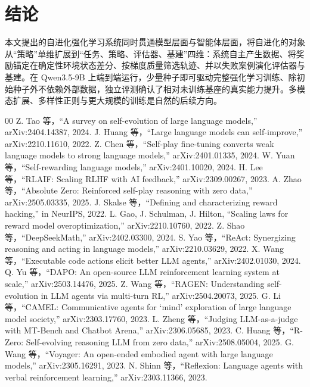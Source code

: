 \documentclass[twocolumn,a4paper]{ctexart}
\begin{document}
\section{结论}

本文提出的自进化强化学习系统同时贯通模型层面与智能体层面，将自进化的对象从“策略”单维扩展到“任务、策略、评估器、基建”四维：系统自主产生数据、将奖励锚定在确定性环境状态差分、按梯度质量筛选轨迹、并以失败案例演化评估器与基建。在 Qwen3.5-9B 上端到端运行，少量种子即可驱动完整强化学习训练、除初始种子外不依赖外部数据，独立评测确认了相对未训练基座的真实能力提升。多模态扩展、多样性正则与更大规模的训练是自然的后续方向。

\begin{thebibliography}{00}
 Z. Tao 等，“A survey on self-evolution of large language models,” arXiv:2404.14387, 2024.
 J. Huang 等，“Large language models can self-improve,” arXiv:2210.11610, 2022.
 Z. Chen 等，“Self-play fine-tuning converts weak language models to strong language models,” arXiv:2401.01335, 2024.
 W. Yuan 等，“Self-rewarding language models,” arXiv:2401.10020, 2024.
 H. Lee 等，“RLAIF: Scaling RLHF with AI feedback,” arXiv:2309.00267, 2023.
 A. Zhao 等，“Absolute Zero: Reinforced self-play reasoning with zero data,” arXiv:2505.03335, 2025.
 J. Skalse 等，“Defining and characterizing reward hacking,” in NeurIPS, 2022.
 L. Gao, J. Schulman, J. Hilton, “Scaling laws for reward model overoptimization,” arXiv:2210.10760, 2022.
 Z. Shao 等，“DeepSeekMath,” arXiv:2402.03300, 2024.
 S. Yao 等，“ReAct: Synergizing reasoning and acting in language models,” arXiv:2210.03629, 2022.
 X. Wang 等，“Executable code actions elicit better LLM agents,” arXiv:2402.01030, 2024.
 Q. Yu 等，“DAPO: An open-source LLM reinforcement learning system at scale,” arXiv:2503.14476, 2025.
 Z. Wang 等，“RAGEN: Understanding self-evolution in LLM agents via multi-turn RL,” arXiv:2504.20073, 2025.
 G. Li 等，“CAMEL: Communicative agents for `mind' exploration of large language model society,” arXiv:2303.17760, 2023.
 L. Zheng 等，“Judging LLM-as-a-judge with MT-Bench and Chatbot Arena,” arXiv:2306.05685, 2023.
 C. Huang 等，“R-Zero: Self-evolving reasoning LLM from zero data,” arXiv:2508.05004, 2025.
 G. Wang 等，“Voyager: An open-ended embodied agent with large language models,” arXiv:2305.16291, 2023.
 N. Shinn 等，“Reflexion: Language agents with verbal reinforcement learning,” arXiv:2303.11366, 2023.
\end{thebibliography}
\end{document}
